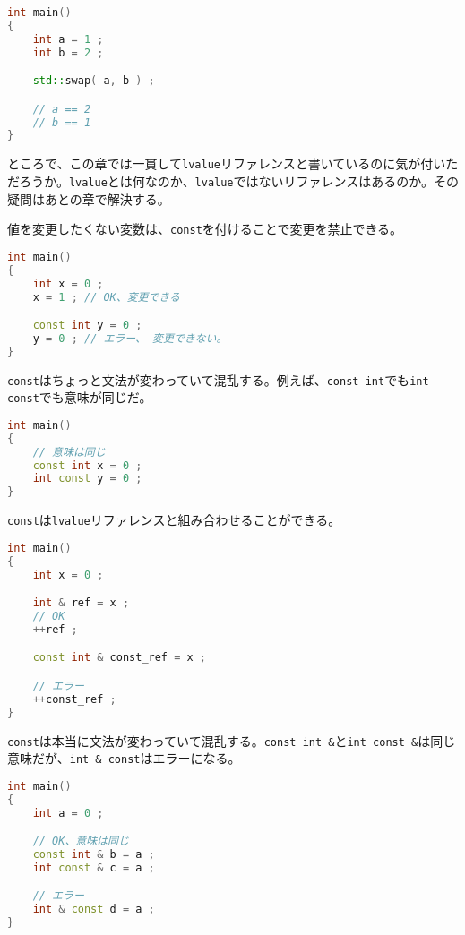 \begin{lstlisting}[language={C++}]
int main()
{
    int a = 1 ;
    int b = 2 ;

    std::swap( a, b ) ;

    // a == 2
    // b == 1
}
\end{lstlisting}

ところで、この章では一貫して\texttt{lvalue}リファレンスと書いているのに気が付いただろうか。\texttt{lvalue}とは何なのか、\texttt{lvalue}ではないリファレンスはあるのか。その疑問はあとの章で解決する。


値を変更したくない変数は、\texttt{const}を付けることで変更を禁止できる。

\begin{lstlisting}[language={C++}]
int main()
{
    int x = 0 ;
    x = 1 ; // OK、変更できる

    const int y = 0 ;
    y = 0 ; // エラー、 変更できない。
}
\end{lstlisting}

\texttt{const}はちょっと文法が変わっていて混乱する。例えば、\texttt{const int}でも\texttt{int const}でも意味が同じだ。

\ifTombow\pagebreak\fi
\begin{lstlisting}[language={C++}]
int main()
{
    // 意味は同じ
    const int x = 0 ;
    int const y = 0 ;
}
\end{lstlisting}

\texttt{const}は\texttt{lvalue}リファレンスと組み合わせることができる。

\begin{lstlisting}[language={C++}]
int main()
{
    int x = 0 ;

    int & ref = x ;
    // OK
    ++ref ;

    const int & const_ref = x ;

    // エラー
    ++const_ref ;
}
\end{lstlisting}

\texttt{const}は本当に文法が変わっていて混乱する。\texttt{const int \&}と\texttt{int const \&}は同じ意味だが、\texttt{int \& const}はエラーになる。

\begin{lstlisting}[language={C++}]
int main()
{
    int a = 0 ;

    // OK、意味は同じ
    const int & b = a ;
    int const & c = a ;

    // エラー
    int & const d = a ;
}
\end{lstlisting}

